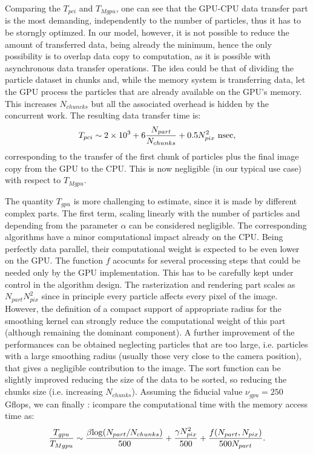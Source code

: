 \documentclass[11pt]{article}
\begin{document}
Comparing the $T_{pci}$ and $T_{Mgpu}$, one can see that the GPU-CPU data transfer
part is the most demanding, independently to the number of particles, thus
it has to be storngly optimzed. In our model, however, it is not possible to 
reduce the amount of transferred data, being already the minimum, hence the only possibility is to
overlap data copy to computation, as it is possible with asynchronous
data transfer operations. The idea could be that of dividing the particle 
dataset in chunks and, while the memory system is transferring data,
let the GPU process the particles that are already available on the 
GPU's memory. This increases $N_{chuncks}$ but all the associated overhead 
is hidden by the concurrent work. The resulting data transfer time is:
\begin{equation}
T_{pci} \sim 2 \times 10^3 + 6 {N_{part}\over N_{chunks}} + 0.5 N_{pix}^2\ {\rm nsec},
\end{equation}
corresponding to the transfer of the first chunk of particles plus the final image copy 
from the GPU to the CPU. This is now negligible (in our typical use case) with respect to
$T_{Mgpu}$.

The quantity $T_{gpu}$ is more challenging to estimate, since it is made by different 
complex parts. The first term, scaling linearly with the number of particles and depending 
from the parameter $\alpha$ can be considered negligible. The corresponding 
algorithms have a minor computational impact already on the CPU. Being perfectly 
data parallel, their computational weight is expected to be even lower on the GPU.
The function $f$ acocunts for several processing steps that could be needed only
by the GPU implementation. This has to be carefully kept under control in 
the algorithm design. The rasterization and rendering part scales as $N_{part}
N_{pix}^2$ since in principle every particle affects every pixel of the image.
However, the definition of a compact support of appropriate radius for the smoothing
kernel can strongly reduce the computational weight of this part (although remaining
the dominant component). A further improvement of the performances can be obtained
neglecting particles that are too large, i.e. particles with a large smoothing radius 
(usually those very close to the camera position), that gives a negligible
contribution to the image. The sort function can be slightly improved reducing 
the size of the data to be sorted, so reducing the chunks size (i.e. increasing 
$N_{chunks}$). 
Assuming the fiducial value $\nu_{gpu} = 250$ Gflops, we can finally :
icompare the computational time with the memory access time as:
\begin{equation}
{T_{gpu}\over T_{Mgpu}} \sim 
{\beta {\rm log}(N_{part}/N_{chunks})\over 500} +
{\gamma N_{pix}^2\over 500} + 
{f(N_{part},N_{pix})\over 500 N_{part}}.
\end{equation}
\end{document}
